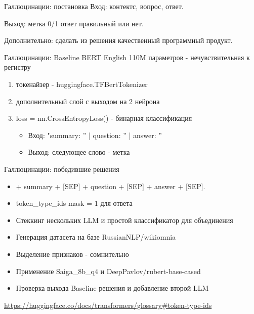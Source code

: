 \documentclass[presentation]{beamer}
\begin{document}
\begin{frame}[label={sec:orgeb9f38f}]{Галлюцинации: постановка}
Вход: контектс, вопрос, ответ.

Выход: метка 0/1 ответ правильный или нет.

Дополнительно: сделать из решения качественный программный продукт.
\end{frame}
\begin{frame}[label={sec:org1fa008a}]{Галлюцинации: Baseline}
BERT English 110M параметров - нечувствительная к регистру
\begin{enumerate}
\item токенайзер - huggingface.TFBertTokenizer
\item дополнительный слой с выходом на 2 нейрона
\item loss = nn.CrossEntropyLoss() - бинарная классификация
\begin{itemize}
\item Вход: "summary: '' | question: '' | answer: ''
\item Выход: следующее слово - метка
\end{itemize}
\end{enumerate}
\end{frame}
\begin{frame}[label={sec:org1ead508}]{Галлюцинации: победившие решения}
\begin{itemize}
\item\relax [CLS] + summary + [SEP] + question + [SEP] + answer + [SEP].
\item token\_type\_ids mask = 1 для ответа
\item Стеккинг нескольких LLM и простой классификатор для объединения
\item Генерация датасета на базе RussianNLP/wikiomnia
\item Выделение признаков - сомнительно
\item Применение Saiga\_8b\_q4 и DeepPavlov/rubert-base-cased
\item Проверка выхода Baseline решения и добавление второй LLM
\end{itemize}









\url{https://huggingface.co/docs/transformers/glossary\#token-type-ids}
\end{frame}
\end{document}
